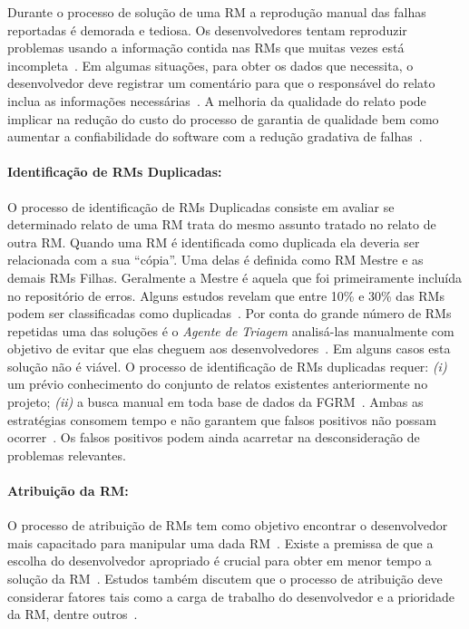 Durante o processo de solução de uma RM a reprodução manual das falhas
reportadas é demorada e tediosa. Os desenvolvedores tentam reproduzir problemas
usando a informação contida nas RMs que muitas vezes está
incompleta~\cite{White:2015:GRR:2820282.2820291}. Em algumas situações, para
obter os dados que necessita, o desenvolvedor deve registrar um comentário para
que o responsável do relato inclua as informações necessárias~\cite{5070993}. A
melhoria da qualidade do relato pode implicar na redução do custo do processo de
garantia de qualidade bem como aumentar a confiabilidade do software com a
redução gradativa de falhas~\cite{Tu:2014:MQI:2677832.2677844}.

\paragraph{Identificação de RMs Duplicadas:}

O processo de identificação de RMs Duplicadas consiste em avaliar se determinado
relato de uma RM trata do mesmo assunto tratado no relato de outra RM\@. Quando
uma RM é identificada como duplicada ela deveria ser relacionada com a sua
``cópia''. Uma delas é definida como RM Mestre e as demais RMs Filhas.
Geralmente a Mestre é aquela que foi primeiramente incluída no repositório de
erros. Alguns estudos revelam que entre 10\% e 30\% das RMs podem ser
classificadas como
duplicadas~\cite{anvik2005coping,cavalcanti2013bug,Runeson:2007:DDD:1248820.1248882}.
Por conta do grande número de RMs repetidas uma das soluções é o \textit{Agente
    de Triagem} analisá-las manualmente com objetivo de evitar que elas cheguem
aos desenvolvedores~\cite{anvik2005coping}. Em alguns casos esta solução não é
viável. O processo de identificação de RMs duplicadas requer: \textit{(i)} um
prévio conhecimento do conjunto de relatos existentes anteriormente no projeto;
\textit{(ii)} a busca manual em toda base de dados da
FGRM~\cite{banerjee2012automated,
    Lerch:2013:FDY:2495256.2495763,hindle2016contextual}. Ambas as estratégias
consomem tempo e não garantem que falsos positivos não possam
ocorrer~\cite{kaushik2012comparative}. Os falsos positivos podem ainda acarretar
na desconsideração de problemas relevantes.

\paragraph{Atribuição da RM:}

O processo de atribuição de RMs tem como objetivo encontrar o desenvolvedor
mais capacitado para manipular uma dada RM~\cite{cavalcanti2014challenges}.
Existe a premissa de que a escolha do desenvolvedor apropriado é crucial para
obter em menor tempo a so\-lu\-ção da RM~\cite{di2002approach}. Estudos também
discutem que o processo de atribuição deve considerar fatores tais como a carga
de trabalho do desenvolvedor e a prioridade da RM, dentre
outros~\cite{aljarah2011selecting}.

